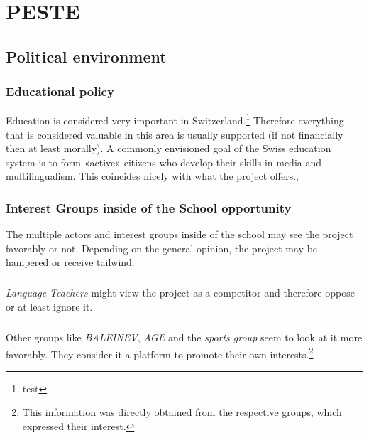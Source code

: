 
\chapter{PESTE} %

\label{ch:examples} %



\section{Political environment}
\subsection{Educational policy} 

\noindent Education is considered very important in Switzerland.\footnote{test} Therefore everything that is considered valuable in this area is usually supported (if not financially then at least morally). A commonly envisioned goal of the Swiss education system is to form «active» citizens who develop their skills in media and multilingualism. This coincides nicely with what the project offers.\autocite{zukunft-bildung},\autocite{oecd-pisa2009}

\subsection{Interest Groups inside of the School opportunity} 
\noindent
The multiple actors and interest groups inside of the school may see the project favorably or not. Depending on the general opinion, the project may be hampered or receive tailwind. \autocite{cormen:2001}
\paragraph{}
\emph{Language Teachers} might view the project as a competitor and therefore oppose or at least ignore it.
\paragraph{}
Other groups like \emph{BALEINEV}, \emph{AGE} and the \emph{sports group} seem to look at it more favorably. They consider it a platform to promote their own interests.\footnote{This information was directly obtained from the respective groups, which expressed their interest.}


